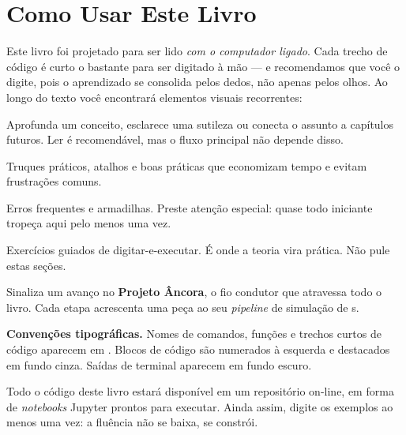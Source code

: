 \chapter*{Como Usar Este Livro}

Este livro foi projetado para ser lido \emph{com o computador ligado}. Cada
trecho de código é curto o bastante para ser digitado à mão --- e recomendamos
que você o digite, pois o aprendizado se consolida pelos dedos, não apenas pelos
olhos. Ao longo do texto você encontrará elementos visuais recorrentes:

\begin{caixanota}
Aprofunda um conceito, esclarece uma sutileza ou conecta o assunto a
capítulos futuros. Ler é recomendável, mas o fluxo principal não depende disso.
\end{caixanota}

\begin{caixadica}
Truques práticos, atalhos e boas práticas que economizam tempo e evitam
frustrações comuns.
\end{caixadica}

\begin{caixaatencao}
Erros frequentes e armadilhas. Preste atenção especial: quase todo iniciante
tropeça aqui pelo menos uma vez.
\end{caixaatencao}

\begin{caixamaos}
Exercícios guiados de digitar-e-executar. É onde a teoria vira prática.
Não pule estas seções.
\end{caixamaos}

\begin{caixaancora}
Sinaliza um avanço no \textbf{Projeto Âncora}, o fio condutor que atravessa todo
o livro. Cada etapa acrescenta uma peça ao seu \emph{pipeline} de simulação de
\qubit{}s.
\end{caixaancora}

\noindent\textbf{Convenções tipográficas.} Nomes de comandos, funções e trechos
curtos de código aparecem em . Blocos de código \python{}
são numerados à esquerda e destacados em fundo cinza. Saídas de terminal
aparecem em fundo escuro.

\begin{caixadica}
Todo o código deste livro estará disponível em um repositório on-line, em forma
de \emph{notebooks} Jupyter prontos para executar. Ainda assim, digite os
exemplos ao menos uma vez: a fluência não se baixa, se constrói.
\end{caixadica}
